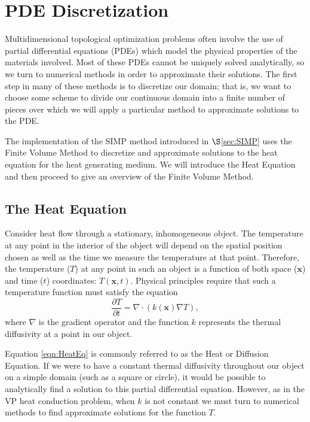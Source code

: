 \section{PDE Discretization}
Multidimensional topological optimization problems often involve the use of partial differential equations (PDEs) which model the physical properties of the materials involved. Most of these PDEs cannot be uniquely solved analytically, so we turn to numerical methods in order to approximate their solutions. The first step in many of these methods is to discretize our domain; that is, we want to choose some scheme to divide our continuous domain into a finite number of pieces over which we will apply a particular method to approximate solutions to the PDE.

The implementation of the SIMP method introduced in $\S$\ref{sec:SIMP} uses the Finite Volume Method to discretize and approximate solutions to the heat equation for the heat generating medium. We will introduce the Heat Equation and then proceed to give an overview of the Finite Volume Method.
\subsection{The Heat Equation}
Consider heat flow through a stationary, inhomogeneous object. The temperature at any point in the interior of the object will depend on the spatial position chosen as well as the time we measure the temperature at that point. Therefore, the temperature ($T$) at any point in such an object is a function of both space ($\mathbf{x}$) and time ($t$) coordinates: $T(\mathbf{x},t)$.
Physical principles require that such a temperature function must satisfy the equation
\begin{equation}
	\frac{\partial T}{\partial t}=\nabla\cdot\left(k(\mathbf{x})\nabla T\right)\label{eqn:HeatEq},
\end{equation}
where $\nabla$ is the gradient operator and the function $k$ represents the thermal diffusivity at a point in our object.

Equation \eqref{eqn:HeatEq} is commonly referred to as the Heat or Diffusion Equation. If we were to have a constant thermal diffusivity throughout our object on a simple domain (such as a square or circle), it would be possible to analytically find a solution to this partial differential equation. However, as in the VP heat conduction problem, when $k$ is not constant we must turn to numerical methods to find approximate solutions for the function $T$.


